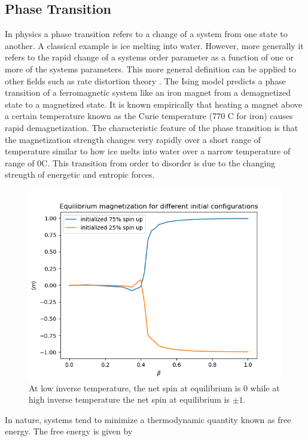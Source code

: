\documentclass{article}
\begin{document}
\subsection{Phase Transition}
In physics a phase transition refers to a change of a system from one state to another. A classical example is ice melting into water.
However, more generally it refers to the rapid change of a systems order parameter as a function of one or more of the systems parameters. 
This more general definition can be applied to other fields such as rate distortion theory \cite{Merhav2010}. The Ising model predicts a phase transition of a ferromagnetic system like an iron magnet from a demagnetized state to a magnetized state. 
It is known empirically that heating a magnet above a certain temperature known as the Curie temperature (770 \degree C for iron) causes rapid
demagnetization. The characteristic feature of the phase transition is that the magnetization strength changes very rapidly over a short range of temperature
similar to how ice melts into water over a narrow temperature of range of 0\degree C. This transition from order to disorder is due to the changing strength of
energetic and entropic forces.

\begin{figure}[ht]
    \includegraphics[width=\columnwidth]{plots/diff_spin_initializations.png}
    \caption{At low inverse temperature, the net spin at equilibrium is 0 while at high inverse temperature the net spin at equilibrium is $\pm 1$.}
    \label{fig:6}
\end{figure}

In nature, systems tend to minimize a thermodynamic quantity known as free energy. The free energy is given by
\end{document}
